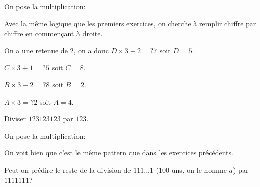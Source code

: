 \documentclass[fleqn,a4paper,nobib]{tufte-handout}
\begin{document}
\begin{solution}

    On pose la multiplication:
    

    Avec la même logique que les premiers exercices,
    on cherche à remplir chiffre par chiffre en
    commençant à droite.
    

    On a une retenue de $2$, on a donc $D\times3+2=?7$
    soit $D = 5$.
    

    $C\times3+1=?5$ soit $C = 8$.

    
    $B\times3+2=?8$ soit $B=2$.
    
    $A\times3=?2$ soit $A=4$. 

\end{solution}
    
    
    
\begin{exercise}
    Diviser $123123123$ par $123$.
\end{exercise}

\begin{solution}
    On pose la multiplication:


    On voit bien que c'est le même pattern que dans les
    exercices précédents.



\end{solution}


\begin{exercise}
    Peut-on prédire le reste de la division de
    $111...1$ (100 uns, on le nomme $a$) par $1111111$?
\end{exercise}
\end{document}
